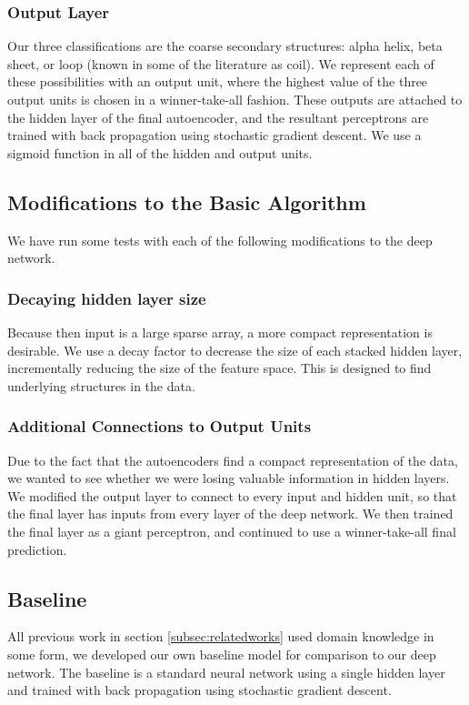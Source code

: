 \documentclass[letterpaper,twocolumn,12pt]{article}
\begin{document}
\subsubsection{Output Layer}
Our three classifications are the coarse secondary structures: alpha helix, beta sheet, or loop (known in some of the literature as coil).
We represent each of these possibilities with an output unit, where the highest value of the three output units is chosen in a winner-take-all fashion.
These outputs are attached to the hidden layer of the final autoencoder, and the resultant perceptrons are trained with back propagation using stochastic gradient descent.
We use a sigmoid function in all of the hidden and output units.

\subsection{Modifications to the Basic Algorithm}
\label{subsec:mods}
We have run some tests with each of the following modifications to the deep network.

\subsubsection{Decaying hidden layer size}
Because then input is a large sparse array, a more compact representation is desirable.
We use a decay factor to decrease the size of each stacked hidden layer, incrementally reducing the size of the feature space.
This is designed to find underlying structures in the data.

\subsubsection{Additional Connections to Output Units}
Due to the fact that the autoencoders find a compact representation of the data, we wanted to see whether we were losing valuable information in hidden layers.
We modified the output layer to connect to every input and hidden unit, so that the final layer has inputs from every layer of the deep network.
We then trained the final layer as a giant perceptron, and continued to use a winner-take-all final prediction.

\subsection{Baseline}
All previous work in section \ref{subsec:relatedworks} used domain knowledge in some form, we developed our own baseline model for comparison to our deep network.
The baseline is a standard neural network using a single hidden layer and trained with back propagation using stochastic gradient descent.
\end{document}
